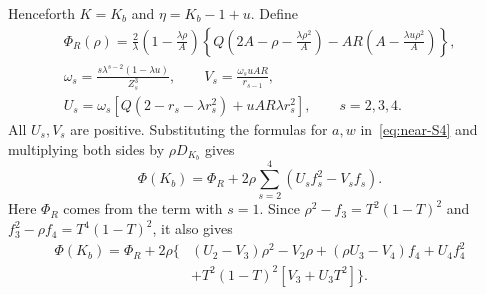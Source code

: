 Henceforth $K=K_b$ and $\eta=K_b-1+u$. Define
\begin{equation}\label{eq:near-complete-finite-profile}
\begin{gathered}
 \Phi_R(\rho)=\frac2\lambda\left(1-\frac{\lambda\rho}{A}\right)
 \left\{Q\left(2A-\rho-\frac{\lambda\rho^2}{A}\right)
       -AR\left(A-\frac{\lambda u\rho^2}{A}\right)\right\},\\
 \omega_s=\frac{s\lambda^{s-2}(1-\lambda u)}{Z_s^3},\qquad
 V_s=\frac{\omega_suAR}{r_{s-1}},\\
 U_s=\omega_s[Q(2-r_s-\lambda r_s^2)+uAR\lambda r_s^2],\qquad s=2,3,4.
\end{gathered}
\end{equation}
All $U_s,V_s$ are positive. Substituting the formulas for $a,w$ in~\eqref{eq:near-S4} and multiplying both sides by $\rho D_{K_b}$ gives
\begin{equation}\label{eq:near-complete-Phi}
 \Phi(K_b)=\Phi_R+2\rho\sum_{s=2}^4(U_sf_s^2-V_sf_s).
\end{equation}
Here $\Phi_R$ comes from the term with $s=1$. Since
$\rho^2-f_3=T^2(1-T)^2$ and $f_3^2-\rho f_4=T^4(1-T)^2$, it also gives
\begin{equation}\label{eq:near-merge}
\begin{split}
 \Phi(K_b)=\Phi_R+2\rho\{&(U_2-V_3)\rho^2-V_2\rho
 +(\rho U_3-V_4)f_4+U_4f_4^2\\
 &+T^2(1-T)^2[V_3+U_3T^2]\}.
\end{split}
\end{equation}


